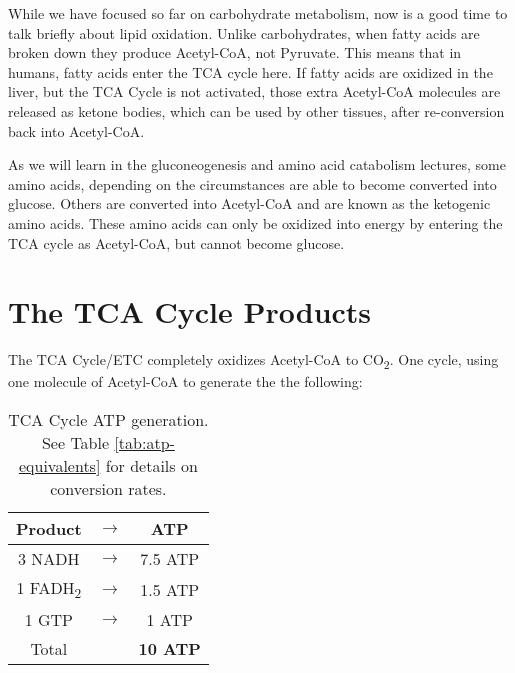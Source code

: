 \documentclass{tufte-handout}
\begin{document}
  While we have focused so far on carbohydrate metabolism, now is a good time to talk briefly about lipid oxidation.  Unlike carbohydrates, when fatty acids are broken down they produce Acetyl-CoA, not Pyruvate.  This means that in humans, fatty acids enter the TCA cycle here.  If fatty acids are oxidized in the liver, but the TCA Cycle is not activated, those extra Acetyl-CoA molecules are released as ketone bodies, which can be used by other tissues, after re-conversion back into Acetyl-CoA.

  As we will learn in the gluconeogenesis and amino acid catabolism lectures, some amino acids, depending on the circumstances are able to become converted into glucose.  Others are converted into Acetyl-CoA and are known as the ketogenic amino acids.  These amino acids can only be oxidized into energy by entering the TCA cycle as Acetyl-CoA, but cannot become glucose.

\section{The TCA Cycle Products}

The TCA Cycle/ETC completely oxidizes Acetyl-CoA to CO\textsubscript{2}.  One cycle, using one molecule of Acetyl-CoA to generate the the following:

\begin{table}
\centering
\caption{TCA Cycle ATP generation.  See Table \ref{tab:atp-equivalents} for details on conversion rates.}
\label{tab:atp-tca}
\begin{tabular}{ccc}
\hline
\textbf {Product} & $\rightarrow$ & \textbf{ATP}\\
\hline
3 NADH & $\rightarrow$ & 7.5 ATP \\
1 FADH\textsubscript{2} & $\rightarrow$ &  1.5 ATP  \\
1 GTP & $\rightarrow$ &  1 ATP  \\
\hline
Total & & \textbf{10 ATP}\\
\end{tabular}
\end{table}
\end{document}

